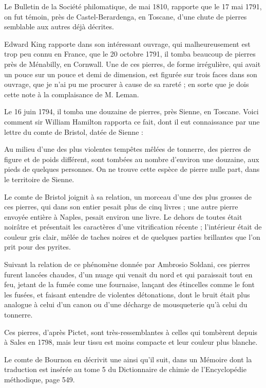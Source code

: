 \documentclass[a4paper, 12pt, oneside, french]{article}
\begin{document}
Le Bulletin de la Société philomatique, de mai 1810, rapporte que le 17 mai 1791, on fut témoin, près de Castel-Berardenga, en Toscane, d'une chute de pierres semblable aux autres déjà décrites.

Edward King rapporte dans son intéressant ouvrage, qui malheureusement est trop peu connu en France, que le 20 octobre 1791, il tomba beaucoup de pierres près de Ménabilly, en Cornwall. Une de ces pierres, de forme irrégulière, qui avait un pouce sur un pouce et demi de dimension, est figurée sur trois faces dans son ouvrage, que je n'ai pu me procurer à cause de sa rareté ; en sorte que je dois cette note à la complaisance de M. Leman.

Le 16 juin 1794, il tomba une douzaine de pierres, près Sienne, en Toscane. Voici comment sir William Hamilton rapporta ce fait, dont il eut connaissance par une lettre du comte de Bristol, datée de Sienne :

\og Au milieu d'une des plus violentes tempêtes mêlées de tonnerre, des pierres de figure et de poids différent, sont tombées au nombre d'environ une douzaine, aux pieds de quelques personnes. On ne trouve cette espèce de pierre nulle part, dans le territoire de Sienne. \fg

Le comte de Bristol joignit à sa relation, un morceau d'une des plus grosses de ces pierres, qui dans son entier pesait plus de cinq livres ; une autre pierre envoyée entière à Naples, pesait environ une livre. Le dehors de toutes était noirâtre et présentait les caractères d'une vitrification récente ; l'intérieur était de couleur gris clair, mêlée de taches noires et de quelques parties brillantes que l'on prit pour des pyrites.

Suivant la relation de ce phénomène donnée par Ambrosio Soldani, ces pierres furent lancées chaudes, d'un nuage qui venait du nord et qui paraissait tout en feu, jetant de la fumée come une fournaise, lançant des étincelles comme le font les fusées, et faisant entendre de violentes détonations, dont le bruit était plus analogue à celui d'un canon ou d'une décharge de mousqueterie qu'à celui du tonnerre.

Ces pierres, d'après Pictet, sont très-ressemblantes à celles qui tombèrent depuis à Sales en 1798, mais leur tissu est moins compacte et leur couleur plus blanche.

Le comte de Bournon en décrivit une ainsi qu'il suit, dans un Mémoire dont la traduction est insérée au tome 5 du Dictionnaire de chimie de l'Encyclopédie méthodique, page 549.
\end{document}
